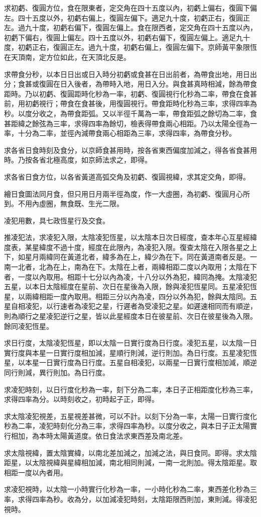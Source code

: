 \begin{pinyinscope}
求初虧、復圓方位，食在限東者，定交角在四十五度以內，初虧上偏右，復圓下偏左。四十五度以外，初虧右偏上，復圓左偏下。適足九十度，初虧正右，復圓正左。過九十度，初虧右偏下，復圓左偏上。食在限西者，定交角在四十五度以內，初虧下偏右，復圓上偏左。四十五度以外，初虧右偏下，復圓左偏上。適足九十度，初虧正右，復圓正左。過九十度，初虧右偏上，復圓左偏下。京師黃平象限恆在天頂南，定方位如此，在天頂北反是。

求帶食分秒，以本日日出或日入時分初虧或食甚在日出前者，為帶食出地，用日出分；食甚或復圓在日入後者，為帶時入地，用日入分。與食甚真時相減，餘為帶食距時。乃以初虧、復圓距時化秒為一率，初虧、復圓視行化秒為二率，帶食在食甚前，用初虧視行；帶食在食甚後，用復圓視行。帶食距時化秒為三率，求得四率為秒。以度分收之，為帶食距弧。又以半徑千萬為一率，帶食距弧之餘切為二率，食甚距緯之餘弦為三率，求得四率為餘切，檢表得帶食兩心相距。乃以太陽全徑為一率，十分為二率，並徑內減帶食兩心相距為三率，求得四率，為帶食分秒。

求各省日食時刻及食分，以京師食甚用時，按各省東西偏度加減之，得各省食甚用時。乃按各省北極高度，如京師法求之，即得。

求各省日食方位，以各省黃道高弧交角及初虧、復圓視緯，求其定交角，即得。

繪日食圖法同月食，但只用日月兩半徑為度，作一大虛圈，為初虧、復圓月心所到。不用內虛圈，無食既、生光二限。

凌犯用數，具七政恆星行及交食。

推凌犯法，求凌犯入限，太陰凌犯恆星，以太陰本日次日經度，查本年心互星經緯度表，某星緯度不過十度，經度在此限內，為凌犯入限。復查太陰在入限各星之上下，如星月兩緯同在黃道北者，緯多為在上，緯少為在下。同在黃道南者反是。一南一北者，北為在上，南為在下。太陰在上者，兩緯相距二度以內取用；太陰在下者，一度以內取用。相距十七分以內為凌，十八分以外為犯，緯同為掩。太陰凌犯五星，以本日太陰經度在星前、次日在星後為入限，餘與凌犯恆星同。五星凌犯恆星，以兩緯相距一度內取用。相距三分以內為凌，四分以外為犯，餘與太陰同。五星自相凌犯，以行速者為凌犯之星，行遲者為受凌犯之星。如遲速相同而有順逆，則為順行之星凌犯逆行之星，皆以此星經度本日在彼星前、次日在彼星後為入限。餘同凌犯恆星。

求日行度，太陰凌犯恆星，即以太陰一日實行度為日行度。凌犯五星，以太陰一日實行度與本星一日實行度相加減，星順行則減，逆行則加。為日行度。五星凌犯恆星，以本星一日實行度為日行度。五星自相凌犯，以兩星一日實行度相加減，順逆同行則減，異行則加。為日行度。

求凌犯時刻，以日行度化秒為一率，刻下分為二率，本日子正相距度化秒為三率，求得四率為分。以時刻收之，初時起子正，即得。

求太陰凌犯視差，五星視差甚微，可以不計。以刻下分為一率，太陽一日實行度化秒為二率，凌犯時刻化分為三率，求得四率為秒。以度分收之，與本日子正太陽實行相加，為本時太陽黃道度。依日食法求東西差及南北差。

求太陰視緯，置太陰實緯，以南北差加減之，加減之法，與日食同。即得。求太陰距星，以太陰視緯與星緯相加減，南北相同則減，一南一北則加。得太陰距星。取相距一度以內者用。

求凌犯視時，以太陰一小時實行化秒為一率，一小時化秒為二率，東西差化秒為三率，求得四率為秒。收為分，以加減凌犯時刻，太陰距限西則加，東則減。得凌犯視時。


\end{pinyinscope}